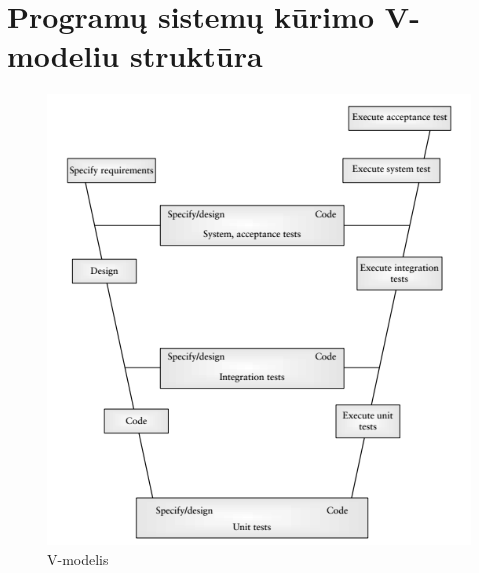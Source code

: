 \documentclass{VUMIFPSkursinis}
\begin{document}
\section{Programų sistemų kūrimo V-modeliu struktūra}
\begin{figure}[H]
    \centering
    \includegraphics[scale=1]{img/Vmodel}
    \caption{V-modelis \cite{Burnstein:2010:PST:1965566}}
    \label{img:vmodel}
\end{figure}
\end{document}
